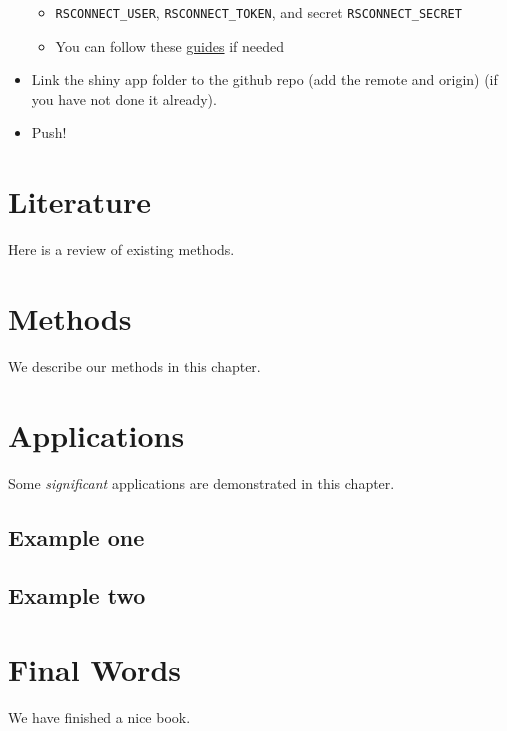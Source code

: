 \documentclass[
]{book}
\providecommand{\tightlist}{%
  \setlength{\itemsep}{0pt}\setlength{\parskip}{0pt}}
\begin{document}
\begin{itemize}
  \begin{itemize}
  \tightlist
  \item
    \texttt{RSCONNECT\_USER}, \texttt{RSCONNECT\_TOKEN}, and secret \texttt{RSCONNECT\_SECRET}
  \item
    You can follow these \href{https://docs.github.com/en/actions/security-guides/encrypted-secrets\#creating-encrypted-secrets-for-a-repository}{guides} if needed
  \end{itemize}
\item
  Link the shiny app folder to the github repo (add the remote and origin) (if you have not done it already).
\item
  Push!
\end{itemize}

\hypertarget{literature}{%
\chapter{Literature}\label{literature}}

Here is a review of existing methods.

\hypertarget{methods}{%
\chapter{Methods}\label{methods}}

We describe our methods in this chapter.

\hypertarget{applications}{%
\chapter{Applications}\label{applications}}

Some \emph{significant} applications are demonstrated in this chapter.

\hypertarget{example-one}{%
\section{Example one}\label{example-one}}

\hypertarget{example-two}{%
\section{Example two}\label{example-two}}

\hypertarget{final-words}{%
\chapter{Final Words}\label{final-words}}

We have finished a nice book.

  
\end{document}
